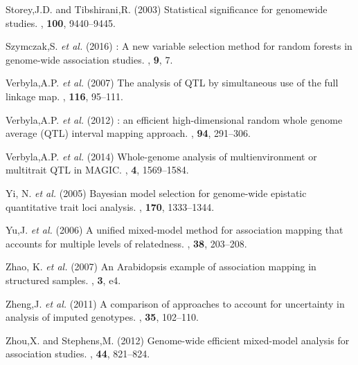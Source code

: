 \documentclass{bioinfo}
\begin{document}
\begin{thebibliography}{}
Storey,J.D. and Tibshirani,R. (2003) 
\newblock Statistical significance for genomewide studies.
, {\bf
  100}, 9440--9445.

Szymczak,S. \textit{et al.} (2016)
: A new variable selection method for random forests in
  genome-wide association studies.
, {\bf 9}, 7.

Verbyla,A.P. \textit{et al.} (2007)
\newblock The analysis of {QTL} by simultaneous use of the full linkage map.
, {\bf 116}, 95--111.

Verbyla,A.P. \textit{et al.} (2012)
: an efficient high-dimensional random whole genome average
  ({QTL}) interval mapping approach.
, {\bf 94}, 291--306.

Verbyla,A.P. \textit{et al.} (2014)
\newblock Whole-genome analysis of multienvironment or multitrait {QTL} in
  {MAGIC}.
, {\bf 4}, 1569--1584.

Yi, N. \textit{et al.} (2005)
\newblock Bayesian model selection for genome-wide epistatic quantitative trait
  loci analysis.
, {\bf 170}, 1333--1344.

Yu,J.  {\em et al.} (2006) 
\newblock A unified mixed-model method for association mapping that accounts
  for multiple levels of relatedness.
, {\bf 38}, 203--208.

Zhao, K.  {\em et al.} (2007)
\newblock An {A}rabidopsis example of association mapping in structured
  samples.
, {\bf 3}, e4.

Zheng,J. \textit{et al.} (2011)
\newblock A comparison of approaches to account for uncertainty in analysis of
  imputed genotypes.
, {\bf 35}, 102--110.

Zhou,X. and Stephens,M. (2012)
\newblock Genome-wide efficient mixed-model analysis for association studies.
, {\bf 44}, 821--824.

\end{thebibliography}
\end{document}
